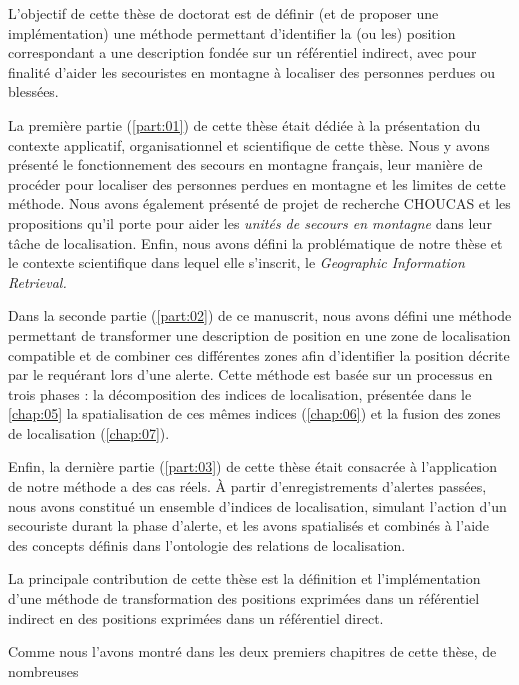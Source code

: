 
L'objectif de cette thèse de doctorat est de définir (et de proposer
une implémentation) une méthode permettant d'identifier la (ou les)
position correspondant a une description fondée sur un référentiel
indirect, avec pour finalité d'aider les secouristes en montagne à
localiser des personnes perdues ou blessées.

La première partie (\ref{part:01}) de cette thèse était dédiée à la
présentation du contexte applicatif, organisationnel et scientifique
de cette thèse. Nous y avons présenté le fonctionnement des secours en
montagne français, leur manière de procéder pour localiser des
personnes perdues en montagne et les limites de cette méthode. Nous
avons également présenté de projet de recherche CHOUCAS et les
propositions qu'il porte pour aider les \emph{unités de secours en
  montagne} dans leur tâche de localisation. Enfin, nous avons défini
la problématique de notre thèse et le contexte scientifique dans
lequel elle s'inscrit, le \emph{Geographic Information Retrieval.}

Dans la seconde partie (\ref{part:02}) de ce manuscrit, nous avons
défini une méthode permettant de transformer une description de
position en une zone de localisation compatible et de combiner ces
différentes zones afin d’identifier la position décrite par le
requérant lors d'une alerte. Cette méthode est basée sur un processus
en trois phases : la décomposition des indices de localisation,
présentée dans le \autoref{chap:05} la spatialisation de ces mêmes
indices (\autoref{chap:06}) et la fusion des zones de localisation
(\autoref{chap:07}).

Enfin, la dernière partie (\ref{part:03}) de cette thèse était
consacrée à l’application de notre méthode a des cas réels. À partir
d'enregistrements d'alertes passées, nous avons constitué un ensemble
d'indices de localisation, simulant l'action d'un secouriste durant la
phase d'alerte, et les avons spatialisés et combinés à l'aide des
concepts définis dans l'ontologie des relations de localisation.


La principale contribution de cette thèse est la définition et
l'implémentation d'une méthode de transformation des positions
exprimées dans un référentiel indirect en des positions exprimées dans
un référentiel direct.


Comme nous l'avons montré dans les deux premiers chapitres de cette
thèse, de nombreuses

